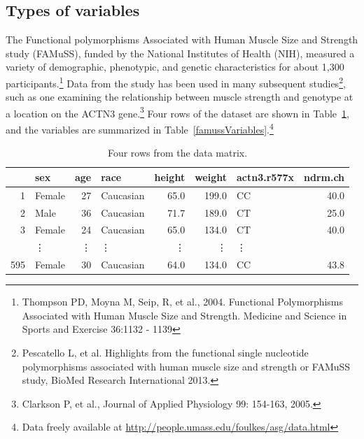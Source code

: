 

\subsection{Types of variables}
\label{variableTypes}


The Functional polymorphisms Associated with Human Muscle Size and Strength study (FAMuSS), funded by the National Institutes of Health (NIH), measured a variety of demographic, phenotypic, and genetic characteristics for about 1,300 participants.\footnote{Thompson PD, Moyna M, Seip, R, et al., 2004.  Functional Polymorphisms Associated with Human Muscle Size and Strength.  Medicine and Science in Sports and Exercise 36:1132 - 1139} Data from the study has been used in many subsequent studies\footnote{Pescatello L, et al. Highlights from the functional single nucleotide polymorphisms associated with human muscle size and strength or FAMuSS study, BioMed Research International 2013.}, such as one examining the relationship between muscle strength and genotype at a location on the ACTN3 gene.\footnote{Clarkson P, et al., Journal of Applied Physiology 99: 154-163, 2005.} Four rows of the  dataset are shown in Table~\ref{famussDF}, and the variables are summarized in Table~\ref{famussVariables}.\footnote{Data freely available at \url{http://people.umass.edu/foulkes/asg/data.html}}

\begin{table}[ht]
	\centering
	\begin{tabular}{rlrlrrlr}
		\hline
		& sex & age & race & height & weight & actn3.r577x & ndrm.ch \\ 
		\hline
		1 & Female & 27 & Caucasian & 65.0 & 199.0 & CC & 40.0 \\ 
		2 & Male & 36 & Caucasian & 71.7 & 189.0 & CT & 25.0 \\ 
		3 & Female & 24 & Caucasian & 65.0 & 134.0 & CT & 40.0 \\ 
       & \vdots & \vdots  & \vdots & \vdots & \vdots & \vdots \\
		595 & Female & 30 & Caucasian & 64.0 & 134.0 & CC & 43.8 \\ 
		\hline
	\end{tabular}
	
	
	\caption{Four rows from the  data matrix.}
	\label{famussDF}
\end{table}

